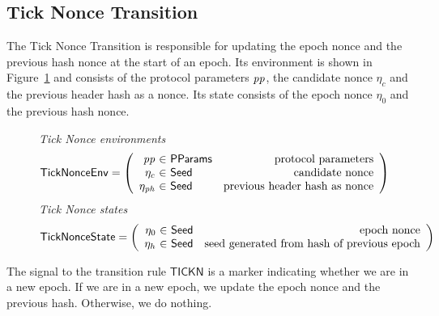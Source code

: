 \clearpage

\subsection{Tick Nonce Transition}
\label{sec:tick-nonce-trans}

The Tick Nonce Transition is responsible for updating the epoch nonce and the
previous hash nonce at the start of an epoch. Its environment is shown in
Figure~\ref{fig:ts-types:ticknonce} and consists of the protocol parameters
$\mathit{pp}$, the candidate nonce $\eta_c$ and the previous header hash as a
nonce. Its state consists of the epoch nonce $\eta_0$ and the previous hash
nonce.

\begin{figure}
  \emph{Tick Nonce environments}
  \begin{equation*}
    \TickNonceEnv =
    \left(
      \begin{array}{r@{~\in~}lr}
        \var{pp} & \PParams & \text{protocol parameters} \\
        \eta_c & \Seed & \text{candidate nonce} \\
        \eta_\var{ph} & \Seed & \text{previous header hash as nonce} \\
      \end{array}
    \right)
  \end{equation*}
  \emph{Tick Nonce states}
  \begin{equation*}
    \TickNonceState =
    \left(
      \begin{array}{r@{~\in~}lr}
        \eta_0 & \Seed & \text{epoch nonce} \\
        \eta_h & \Seed & \text{seed generated from hash of previous epoch} \\
      \end{array}
    \right)
  \end{equation*}
  \label{fig:ts-types:ticknonce}
\end{figure}

The signal to the transition rule $\mathsf{TICKN}$ is a marker indicating
whether we are in a new epoch. If we are in a new epoch, we update the epoch
nonce and the previous hash. Otherwise, we do nothing.

